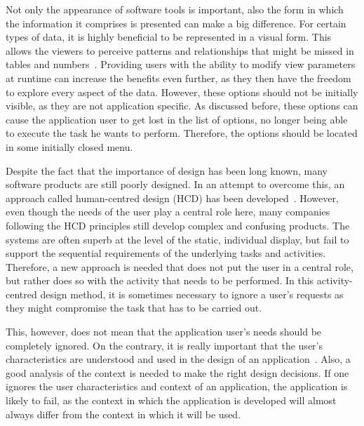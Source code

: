 Not only the appearance of software tools is important, also the form in which the information it comprises is presented can make a big difference. For certain types of data, it is highly beneficial to be represented in a visual form. This allows the viewers to perceive patterns and relationships that might be missed in tables and numbers~\cite{gallopoulos1994computer}. Providing users with the ability to modify view parameters at runtime can increase the benefits even further, as they then have the freedom to explore every aspect of the data. However, these options should not be initially visible, as they are not application specific. As discussed before, these options can cause the application user to get lost in the list of options, no longer being able to execute the task he wants to perform. Therefore, the options should be located in some initially closed menu.

Despite the fact that the importance of design has been long known, many software products are still poorly designed. In an attempt to overcome this, an approach called human-centred design (HCD) has been developed~\cite{norman2005human}. However, even though the needs of the user play a central role here, many companies following the HCD principles still develop complex and confusing products. The systems are often superb at the level of the static, individual display, but fail to support the sequential requirements of the underlying tasks and activities. Therefore, a new approach is needed that does not put the user in a central role, but rather does so with the activity that needs to be performed. In this activity-centred design method, it is sometimes necessary to ignore a user's requests as they might compromise the task that has to be carried out.

This, however, does not mean that the application user's needs should be completely ignored. On the contrary, it is really important that the user's characteristics are understood and used in the design of an application~\cite{badre2002shaping}. Also, a good analysis of the context is needed to make the right design decisions. If one ignores the user characteristics and context of an application, the application is  likely to fail, as the context in which the application is developed will almost always differ from the context in which it will be used.

